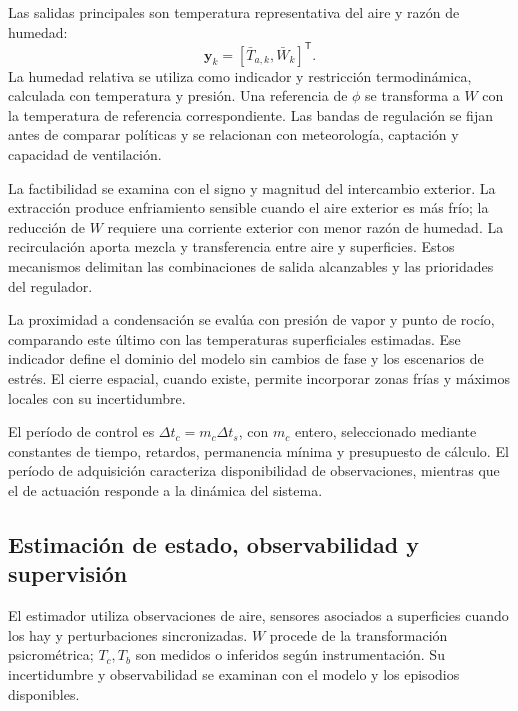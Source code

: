 Las salidas principales son temperatura representativa del aire y razón de humedad:
\begin{equation}
\mathbf y_k=[\bar T_{a,k},\bar W_k]^{\mathsf T}.
\label{met:salidas_control}
\end{equation}
La humedad relativa se utiliza como indicador y restricción termodinámica, calculada con temperatura y presión. Una referencia de $\phi$ se transforma a $W$ con la temperatura de referencia correspondiente. Las bandas de regulación se fijan antes de comparar políticas y se relacionan con meteorología, captación y capacidad de ventilación.

La factibilidad se examina con el signo y magnitud del intercambio exterior. La extracción produce enfriamiento sensible cuando el aire exterior es más frío; la reducción de $W$ requiere una corriente exterior con menor razón de humedad. La recirculación aporta mezcla y transferencia entre aire y superficies. Estos mecanismos delimitan las combinaciones de salida alcanzables y las prioridades del regulador.

La proximidad a condensación se evalúa con presión de vapor y punto de rocío, comparando este último con las temperaturas superficiales estimadas. Ese indicador define el dominio del modelo sin cambios de fase y los escenarios de estrés. El cierre espacial, cuando existe, permite incorporar zonas frías y máximos locales con su incertidumbre.

El período de control es $\Delta t_c=m_c\Delta t_s$, con $m_c$ entero, seleccionado mediante constantes de tiempo, retardos, permanencia mínima y presupuesto de cálculo. El período de adquisición caracteriza disponibilidad de observaciones, mientras que el de actuación responde a la dinámica del sistema.

\subsection{Estimación de estado, observabilidad y supervisión}
\label{met:estimacion}

El estimador utiliza observaciones de aire, sensores asociados a superficies cuando los hay y perturbaciones sincronizadas. $W$ procede de la transformación psicrométrica; $T_c,T_b$ son medidos o inferidos según instrumentación. Su incertidumbre y observabilidad se examinan con el modelo y los episodios disponibles.

